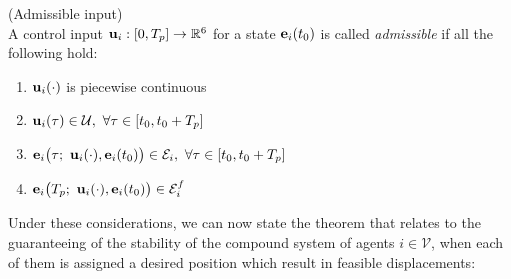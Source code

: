 \begin{bw_box}
\begin{definition} (Admissible input)\\

  A control input $\bm{\mathbf{u}}_i : [0, T_p] \to \mathbb{R}^6$ for a state
  $\bm{\mathbf{e}}_i(t_0)$ is called \textit{admissible} if all the following hold:

  \begin{enumerate}
    \item $\bm{\mathbf{u}}_i(\cdot)$ is piecewise continuous
    \item $\vect{u}_i(\tau) \in \mathcal{U},\ \forall \tau \in [t_0, t_0 + T_p]$
    \item $\vect{e}_i\big(\tau;\ \vect{u}_i(\cdot), \vect{e}_i(t_0)\big) \in \mathcal{E}_i,\ \forall \tau \in [t_0, t_0 + T_p]$
    \item $\vect{e}_i\big(T_p;\ \vect{u}_i(\cdot), \vect{e}_i(t_0)\big) \in \mathcal{E}_i^f$
  \end{enumerate}

\end{definition}
\end{bw_box}

Under these considerations, we can now state the theorem that relates to
the guaranteeing of the stability of the compound system of agents
$i \in \mathcal{V}$, when each of them is assigned a desired
position which result in feasible displacements:\\

